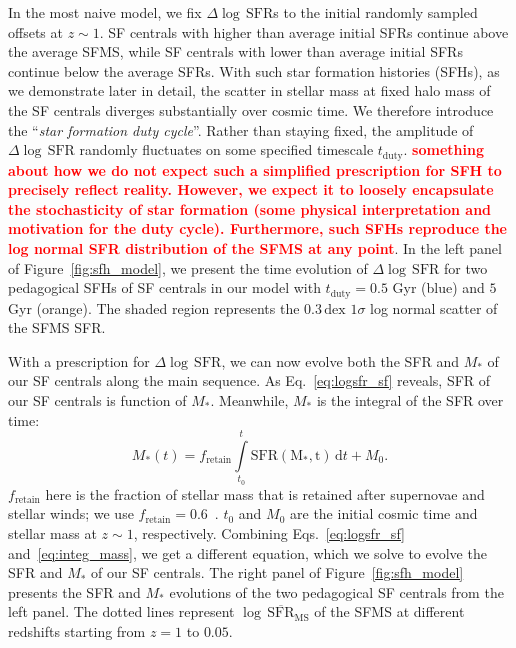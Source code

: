 \documentclass[12pt, letterpaper, preprint]{aastex}
\newcommand{\todo}[1]{{\bf \textcolor{red}{#1}}}
\newcommand{\beq}{\begin{equation}}
\newcommand{\eeq}{\end{equation}}
\newcommand{\logsfr}{\log \, \mathrm{SFR}}
\begin{document}
In the most naive model, we fix $\Delta \logsfr$s to the initial randomly 
sampled offsets at $z \sim 1$. SF centrals with higher than average 
initial SFRs continue above the average SFMS, while SF centrals 
with lower than average initial SFRs continue below the average SFRs. 
With such star formation histories (SFHs), as we demonstrate later in detail, 
the scatter in stellar mass at fixed halo mass of the SF centrals diverges 
substantially over cosmic time. We therefore introduce the ``\emph{star formation duty 
cycle}''. Rather than staying fixed, the amplitude of $\Delta \logsfr$ randomly 
fluctuates on some specified timescale $t_\mathrm{duty}$. 
\todo{something about how 
we do not expect such a simplified prescription for SFH to precisely reflect 
reality. However, we expect it to loosely encapsulate the stochasticity of 
star formation (some physical interpretation and motivation for the duty cycle). 
Furthermore, such SFHs reproduce the log normal SFR distribution of the SFMS 
at any point}. 
In the left panel of Figure~\ref{fig:sfh_model}, we 
present the time evolution of $\Delta \logsfr$ for two pedagogical SFHs of SF 
centrals in our model with $t_\mathrm{duty} = 0.5$ Gyr (blue) and $5$ Gyr (orange).  
The shaded region represents the $0.3\,\mathrm{dex}$ $1\sigma$ log normal 
scatter of the SFMS SFR.  

With a prescription for $\Delta \logsfr$, we can now evolve both the 
SFR and $M_*$ of our SF centrals along the main sequence. As Eq.~\ref{eq:logsfr_sf}
reveals, SFR of our SF centrals is function of $M_*$. Meanwhile, $M_*$ is the
integral of the SFR over time: 
\beq \label{eq:integ_mass} 
M_*(t) = f_\mathrm{retain} \int\limits_{t_0}^{t} \mathrm{SFR(M_*, t)}\,\mathrm{d}t + M_0. 
\eeq
$f_\mathrm{retain}$ here is the fraction of stellar mass that is retained after 
supernovae and stellar winds; we use $f_\mathrm{retain} = 0.6$~\citep{wetzel2013}. 
$t_0$ and $M_0$ are the initial cosmic time and stellar mass at $z \sim 1$, respectively. 
Combining Eqs.~\ref{eq:logsfr_sf} and~\ref{eq:integ_mass}, we get a different 
equation, which we solve to evolve the SFR and $M_*$ of our SF centrals.  
The right panel of Figure~\ref{fig:sfh_model} presents the SFR and $M_*$ 
evolutions of the two pedagogical SF centrals from the left panel. The dotted 
lines represent $\log\,\overline{\mathrm{SFR}}_\mathrm{MS}$ of the SFMS at different 
redshifts starting from $z = 1$ to $0.05$. %
\end{document}
